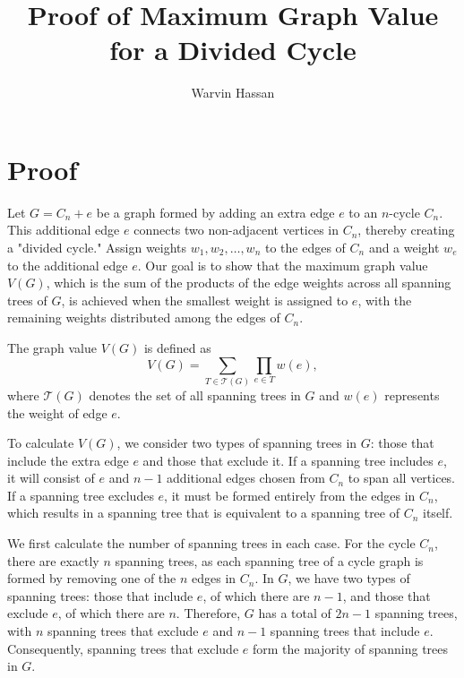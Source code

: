 \documentclass{article}
\begin{document}
\title{Proof of Maximum Graph Value for a Divided Cycle}
\author{Warvin Hassan}
\date{}
\maketitle

\section*{Proof}

Let \( G = C_n + e \) be a graph formed by adding an extra edge \( e \) to an \( n \)-cycle \( C_n \). This additional edge \( e \) connects two non-adjacent vertices in \( C_n \), thereby creating a "divided cycle." Assign weights \( w_1, w_2, \ldots, w_n \) to the edges of \( C_n \) and a weight \( w_{e} \) to the additional edge \( e \). Our goal is to show that the maximum graph value \( V(G) \), which is the sum of the products of the edge weights across all spanning trees of \( G \), is achieved when the smallest weight is assigned to \( e \), with the remaining weights distributed among the edges of \( C_n \).

The graph value \( V(G) \) is defined as
\[
V(G) = \sum_{T \in \mathcal{T}(G)} \prod_{e \in T} w(e),
\]
where \( \mathcal{T}(G) \) denotes the set of all spanning trees in \( G \) and \( w(e) \) represents the weight of edge \( e \).

To calculate \( V(G) \), we consider two types of spanning trees in \( G \): those that include the extra edge \( e \) and those that exclude it. If a spanning tree includes \( e \), it will consist of \( e \) and \( n - 1 \) additional edges chosen from \( C_n \) to span all vertices. If a spanning tree excludes \( e \), it must be formed entirely from the edges in \( C_n \), which results in a spanning tree that is equivalent to a spanning tree of \( C_n \) itself.

We first calculate the number of spanning trees in each case. For the cycle \( C_n \), there are exactly \( n \) spanning trees, as each spanning tree of a cycle graph is formed by removing one of the \( n \) edges in \( C_n \). In \( G \), we have two types of spanning trees: those that include \( e \), of which there are \( n - 1 \), and those that exclude \( e \), of which there are \( n \). Therefore, \( G \) has a total of \( 2n - 1 \) spanning trees, with \( n \) spanning trees that exclude \( e \) and \( n - 1 \) spanning trees that include \( e \). Consequently, spanning trees that exclude \( e \) form the majority of spanning trees in \( G \).
\end{document}
